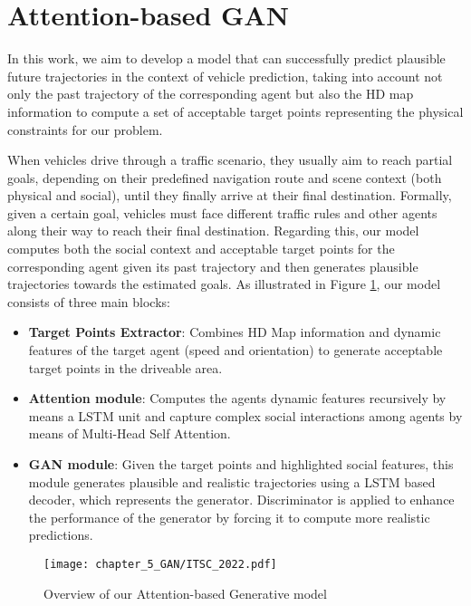 \section{Attention-based GAN}
\label{sec:5_attention_gan}

In this work, we aim to develop a model \cite{gomez2022exploring} that can successfully predict plausible future trajectories in the context of vehicle prediction, taking into account not only the past trajectory of the corresponding agent but also the HD map information to compute a set of acceptable target points representing the physical constraints for our problem.

When vehicles drive through a traffic scenario, they usually aim to reach partial goals, depending on their predefined navigation route and scene context (both physical and social), until they finally arrive at their final destination. Formally, given a certain goal, vehicles must face different traffic rules and other agents along their way to reach their final destination. Regarding this, our model computes both the social context and acceptable target points for the corresponding agent given its past trajectory and then generates plausible trajectories towards the estimated goals. As illustrated in Figure \ref{fig:chapter_5_GAN/ITSC_2022}, our model consists of three main blocks:

\begin{itemize}
	
	\item \textbf{Target Points Extractor}: Combines HD Map information and dynamic features of the target agent (speed and orientation) to generate acceptable target points in the driveable area.
	\item \textbf{Attention module}: Computes the agents dynamic features recursively by means a \ac{LSTM} unit and capture complex social interactions among agents by means of Multi-Head Self Attention.
	\item \textbf{\ac{GAN} module}: Given the target points and highlighted social features, this module generates plausible and realistic trajectories using a LSTM based decoder, which represents the generator. Discriminator is applied to enhance the performance of the generator by forcing it to compute more realistic predictions.
	
\end{itemize} 

\begin{figure}[h] 
	\centering
	\texttt{[image: chapter\_5\_GAN/ITSC\_2022.pdf]}
	\caption{Overview of our Attention-based Generative model}
	\label{fig:chapter_5_GAN/ITSC_2022}
\end{figure}

